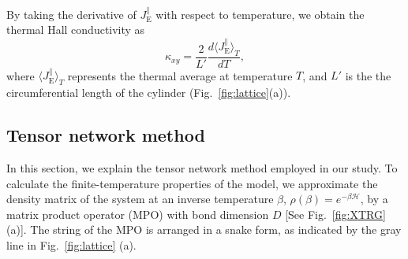 \documentclass[twocolumn,superscriptaddress,showpacs, longbibliography, aps, prb]{revtex4-2}
\newcommand{\blue}[1]{\textcolor{blue}{#1}}
\newcommand{\orange}[1]{\textcolor{orange}{#1}}
\begin{document}

By taking the derivative of $J_{\mathrm{E}}^{\parallel}$ with respect to %
temperature, we obtain the thermal Hall conductivity as 
\begin{equation}
 \kappa_{xy}=\frac{2}{L'} \frac{d \langle J_{\mathrm{E}}^{\parallel}\rangle_{T}}{d T},
\label{eq:def_kxy}
\end{equation}
where $\langle J_{\mathrm{E}}^{\parallel} \rangle_T$ represents the thermal average at %
temperature $T$, and $L'$ is the 
the circumferential length of the cylinder
(Fig.~\ref{fig:lattice}(a)). 


\subsection{Tensor network method}
In this section, we explain the tensor network method %
employed in our study. 
To calculate the finite-temperature properties of the model, 
we approximate %
the density matrix of the system at an inverse temperature $\beta$, $\rho(\beta) = e^{-\beta\mathcal{H}}$, %
by a matrix product operator (MPO) with %
bond dimension $D$ [See Fig.~\ref{fig:XTRG}(a)]. The string of the MPO is arranged in a snake form, %
as indicated by the gray line in Fig.~\ref{fig:lattice} (a). 
\end{document}
